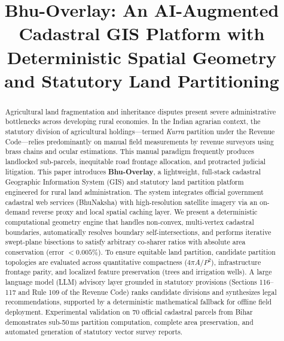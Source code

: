 \documentclass[conference]{IEEEtran}
\begin{document}
\title{Bhu-Overlay: An AI-Augmented Cadastral GIS Platform with Deterministic Spatial Geometry and Statutory Land Partitioning}

\author{
\and
{}
}

\maketitle

\begin{abstract}
Agricultural land fragmentation and inheritance disputes present severe administrative bottlenecks across developing rural economies. In the Indian agrarian context, the statutory division of agricultural holdings---termed \textit{Kurra} partition under the Revenue Code---relies predominantly on manual field measurements by revenue surveyors using brass chains and ocular estimations. This manual paradigm frequently produces landlocked sub-parcels, inequitable road frontage allocation, and protracted judicial litigation. This paper introduces \textbf{Bhu-Overlay}, a lightweight, full-stack cadastral Geographic Information System (GIS) and statutory land partition platform engineered for rural land administration. The system integrates official government cadastral web services (BhuNaksha) with high-resolution satellite imagery via an on-demand reverse proxy and local spatial caching layer. We present a deterministic computational geometry engine that handles non-convex, multi-vertex cadastral boundaries, automatically resolves boundary self-intersections, and performs iterative swept-plane bisections to satisfy arbitrary co-sharer ratios with absolute area conservation (error $< 0.005\%$). To ensure equitable land partition, candidate partition topologies are evaluated across quantitative compactness ($4\pi A / P^2$), infrastructure frontage parity, and localized feature preservation (trees and irrigation wells). A large language model (LLM) advisory layer grounded in statutory provisions (Sections 116--117 and Rule 109 of the Revenue Code) ranks candidate divisions and synthesizes legal recommendations, supported by a deterministic mathematical fallback for offline field deployment. Experimental validation on 70 official cadastral parcels from Bihar demonstrates sub-50\,ms partition computation, complete area preservation, and automated generation of statutory vector survey reports.
\end{abstract}
\end{document}
